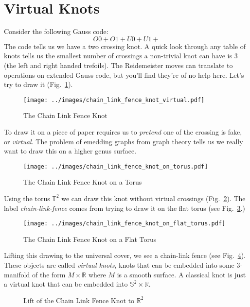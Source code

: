 \documentclass{article}
\theoremstyle{plain}
\begin{document}
    \section{Virtual Knots}
        Consider the following Gauss code:
        \begin{equation}
            O0+O1+U0+U1+
        \end{equation}
        The code tells us we have a two crossing knot. A quick look through any
        table of knots tells us the smallest number of crossings a non-trivial
        knot can have is 3 (the left and right handed trefoils). The
        Reidemeister moves can translate to operations on extended Gauss code,
        but you'll find they're of no help here. Let's try to draw it
        (Fig.~\ref{fig:chain_link_fence_knot}).
        \begin{figure}
            \centering
            \texttt{[image: ../images/chain\_link\_fence\_knot\_virtual.pdf]}
            \caption{The Chain Link Fence Knot}
            \label{fig:chain_link_fence_knot}
        \end{figure}
        To draw it on a piece of paper requires us to \textit{pretend} one of
        the crossing is fake, or \textit{virtual}. The problem of emedding
        graphs from graph theory tells us we really want to draw this on a
        higher genus surface.
        \begin{figure}
            \centering
            \texttt{[image: ../images/chain\_link\_fence\_knot\_on\_torus.pdf]}
            \caption{The Chain Link Fence Knot on a Torus}
            \label{fig:chain_link_fence_knot_on_torus}
        \end{figure}
        Using the torus $\mathbb{T}^{2}$ we can draw this knot without virtual
        crossings (Fig.~\ref{fig:chain_link_fence_knot_on_torus}).
        The label \textit{chain-link-fence} comes from trying to draw it
        on the flat torus
        (see Fig.~\ref{fig:chain_link_fence_knot_on_flat_torus}.)
        \begin{figure}
            \centering
            \texttt{[image: ../images/chain\_link\_fence\_knot\_on\_flat\_torus.pdf]}
            \caption{The Chain Link Fence Knot on a Flat Torus}
            \label{fig:chain_link_fence_knot_on_flat_torus}
        \end{figure}
        Lifting this drawing to the universal cover, we see a chain-link fence
        (see Fig.~\ref{fig:chain_link_fence_knot_on_flat_torus_universal_cover}).
        These objects are called \textit{virtual knots}, knots that can be
        embedded into some 3-manifold of the form $M\times\mathbb{R}$ where
        $M$ is a smooth surface. A classical knot is just a virtual knot
        that can be embedded into $\mathbb{S}^{2}\times\mathbb{R}$.
        \begin{figure}
            \centering
            \caption{Lift of the Chain Link Fence Knot to $\mathbb{R}^{2}$}
            \label{fig:chain_link_fence_knot_on_flat_torus_universal_cover}
        \end{figure}
\end{document}
